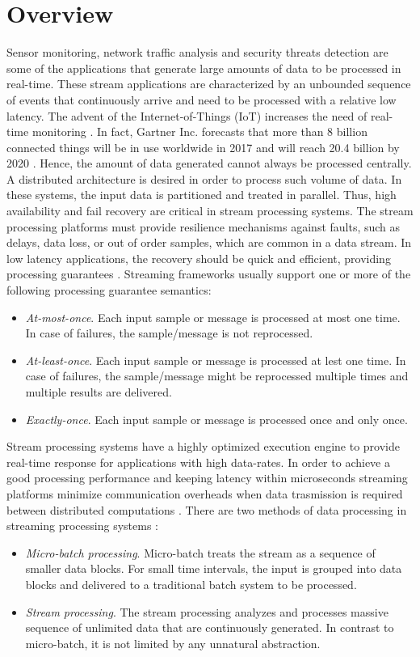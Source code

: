 \section{Overview}
Sensor monitoring, network traffic analysis and security threats detection are some of the applications that generate large amounts of data to be processed in real-time. These stream applications are characterized by an unbounded sequence of events that continuously arrive and need to be processed with a relative low latency. The advent of the Internet-of-Things (IoT) increases the need of real-time monitoring \cite{streamprocessingcomparison}. In fact, Gartner Inc. forecasts that more than 8 billion connected things will be in use worldwide in 2017 and will reach 20.4 billion by 2020 \cite{gartnerarticleonline}. Hence, the amount of data generated cannot always be processed centrally. A distributed architecture is desired in order to process such volume of data.  In these systems, the input data is partitioned and treated in parallel. Thus, high availability and fail recovery are critical in stream processing systems. The stream processing platforms must provide resilience mechanisms against faults, such as delays, data loss, or out of order samples, which are common in a data stream. In low latency applications, the recovery should be quick and efficient, providing processing guarantees \cite{streamprocessingcomparison}. Streaming frameworks usually support one or more of the following processing guarantee semantics:
\begin{itemize}
\item \emph{At-most-once}. Each input sample or message is processed at most one time. In case of failures, the sample/message is not reprocessed.
\item \emph{At-least-once}.  Each input sample or message is processed at lest one time. In case of failures, the sample/message might be reprocessed multiple times and multiple results are delivered.
\item  \emph{Exactly-once}. Each input sample or message is processed once and only once.
\end{itemize}

Stream processing systems have a highly optimized execution engine to provide real-time response for applications with high data-rates. In order to achieve a good processing performance and keeping latency within microseconds streaming platforms minimize communication overheads when data trasmission is required between distributed computations \cite{streamprocessingcomparison}. There are two methods of data processing in streaming processing systems \cite{streamprocessingcomparison}:
\begin{itemize}
\item \emph{Micro-batch processing}. Micro-batch treats the stream as a sequence of smaller data blocks. For small time intervals, the input is grouped into data blocks and delivered to a traditional batch system to be processed.
\item \emph{Stream processing}. The stream processing analyzes and processes massive sequence of unlimited data that are continuously generated. In contrast to micro-batch, it is not limited by any unnatural abstraction.
\end{itemize}

